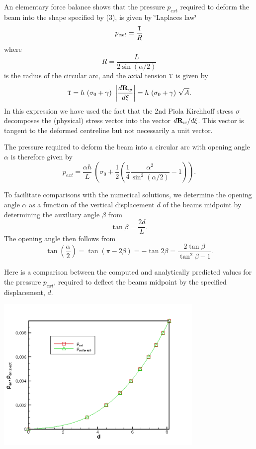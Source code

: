 An elementary force balance shows that the pressure $ p_{ext} $ required to deform the beam into the shape specified by (3), is given by \char`\"{}\+Laplace\textquotesingle{}s law\char`\"{} \[ p_{ext} =\frac{{\tt T}}{R} \] where \[ R = \frac{L}{2 \sin(\alpha/2)} \] is the radius of the circular arc, and the axial tension $ {\tt T} $ is given by \[ {\tt T} = h \ (\sigma_0 + \gamma) \ \left|\frac{d{\bf R}_w}{d\xi}\right| = h \ (\sigma_0 + \gamma) \ \sqrt{A}. \] In this expression we have used the fact that the 2nd Piola Kirchhoff stress $ \sigma $ decomposes the (physical) stress vector into the vector $ d{\bf R}_w/d\xi $. This vector is tangent to the deformed centreline but not necessarily a unit vector.

The pressure required to deform the beam into a circular arc with opening angle $ \alpha $ is therefore given by \[ p_{ext} = \frac{\alpha h}{L} \ \left(\sigma_0 + \frac{1}{2}\left(\frac{1}{4}\frac{\alpha^2}{\sin^2(\alpha/2)} - 1 \right) \right). \]

To facilitate comparisons with the numerical solutions, we determine the opening angle $ \alpha $ as a function of the vertical displacement $ d $ of the beam\textquotesingle{}s midpoint by determining the auxiliary angle $ \beta $ from \[ \tan\beta = \frac{2d}{L}. \] The opening angle then follows from \[ \tan\left(\frac{\alpha}{2}\right) = \tan(\pi - 2\beta) = - \tan 2\beta = \frac{2\tan\beta}{\tan^{2}\beta -1}. \]

Here is a comparison between the computed and analytically predicted values for the pressure $ p_{ext} $, required to deflect the beam\textquotesingle{}s midpoint by the specified displacement, $ d $.

 
\begin{DoxyImage}
\includegraphics[width=0.75\textwidth]{trace}
\end{DoxyImage}


